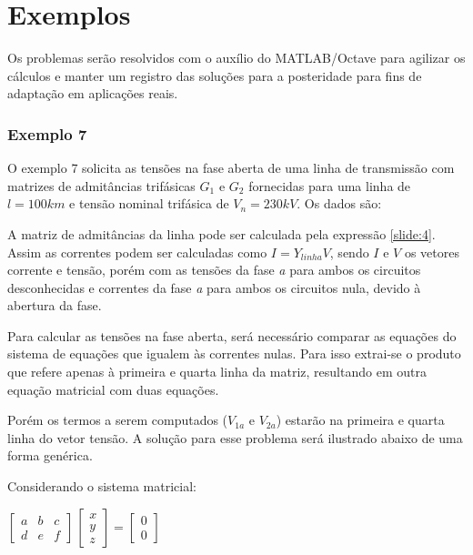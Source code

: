 \section{Exemplos}


Os problemas serão resolvidos com o auxílio do MATLAB/Octave para agilizar os cálculos e manter um registro das soluções para a posteridade para fins de adaptação em aplicações reais.

\subsubsection*{Exemplo 7}

O exemplo 7 solicita as tensões na fase aberta de uma linha de transmissão com matrizes de admitâncias trifásicas $G_1$ e $G_2$ fornecidas para uma linha de $l = 100 km$ e tensão nominal trifásica de $V_n= 230 kV$. Os dados são:



A matriz de admitâncias da linha pode ser calculada pela expressão \ref{slide:4}. Assim as correntes podem ser calculadas como $I = Y_{linha} V$, sendo $I$ e $V$ os vetores corrente e tensão, porém com as tensões da fase \textit{a} para ambos os circuitos desconhecidas e correntes da fase \textit{a} para ambos os circuitos nula, devido à abertura da fase.

Para calcular as tensões na fase aberta, será necessário comparar as equações do sistema de equações que igualem às correntes nulas. Para isso extrai-se o produto que refere apenas à primeira e quarta linha da matriz, resultando em outra equação matricial com duas equações. 

Porém os termos a serem computados ($V_{1a}$ e $V_{2a}$) estarão na primeira e quarta linha do vetor tensão. A solução para esse problema será ilustrado abaixo de uma forma genérica.

Considerando o sistema matricial:

\begin{center}
    $\begin{bmatrix} a & b & c \\ d & e & f \end{bmatrix} \, \begin{bmatrix} x  \\ y \\ z \end{bmatrix} = \begin{bmatrix} 0  \\ 0 \end{bmatrix}$
\end{center}

